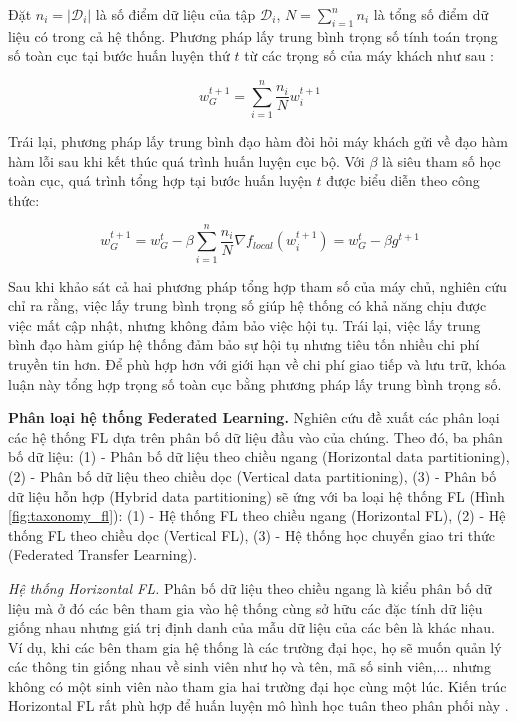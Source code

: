 Đặt $n_i = |\mathcal{D}_i|$ là số điểm dữ liệu của tập $\mathcal{D}_i$, $N = \sum_{i=1}^n{n_i}$ là tổng số điểm dữ liệu có trong cả hệ thống. Phương pháp lấy trung bình trọng số tính toán trọng số toàn cục tại bước huấn luyện thứ $t$ từ các trọng số của máy khách như sau \cite{mcmahan2017communication}:

\begin{equation}
    \label{eq:agg_w}
    w_G^{t+1} = \sum_{i=1}^n{\frac{n_i}{N} w_i^{t+1}}
\end{equation}

Trái lại, phương pháp lấy trung bình đạo hàm đòi hỏi máy khách gửi về đạo hàm hàm lỗi sau khi kết thúc quá trình huấn luyện cục bộ. Với $\beta$ là siêu tham số học toàn cục, quá trình tổng hợp tại bước huấn luyện $t$ được biểu diễn theo công thức:

\begin{dmath}
    w_G^{t+1} = w_G^t - \beta  \sum_{i=1}^n{\frac{n_i}{N} \nabla f_{local}(w_i^{t+1})}
        = w_G^t - \beta g^{t+1}
\end{dmath}

Sau khi khảo sát cả hai phương pháp tổng hợp tham số của máy chủ, nghiên cứu \cite{yin2021comprehensive} chỉ ra rằng, việc lấy trung bình trọng số giúp hệ thống có khả năng chịu được việc mất cập nhật, nhưng không đảm bảo việc hội tụ. Trái lại, việc lấy trung bình đạo hàm giúp hệ thống đảm bảo sự hội tụ nhưng tiêu tốn nhiều chi phí truyền tin hơn. Để phù hợp hơn với giới hạn về chi phí giao tiếp và lưu trữ, khóa luận này tổng hợp trọng số toàn cục bằng phương pháp lấy trung bình trọng số.

\textbf{Phân loại hệ thống Federated Learning.} Nghiên cứu \cite{yin2021comprehensive} đề xuất các phân loại các hệ thống FL dựa trên phân bố dữ liệu đầu vào của chúng. Theo đó, ba phân bố dữ liệu: (1) - Phân bố dữ liệu theo chiều ngang (Horizontal data partitioning), (2) - Phân bố dữ liệu theo chiều dọc (Vertical data partitioning), (3) - Phân bố dữ liệu hỗn hợp (Hybrid data partitioning) sẽ ứng với ba loại hệ thống FL (Hình \ref{fig:taxonomy_fl}): (1) - Hệ thống FL theo chiều ngang (Horizontal FL), (2) - Hệ thống FL theo chiều dọc (Vertical FL), (3) - Hệ thống học chuyển giao tri thức (Federated Transfer Learning).

\textit{Hệ thống Horizontal FL.} Phân bố dữ liệu theo chiều ngang là kiểu phân bố dữ liệu mà ở đó các bên tham gia vào hệ thống cùng sở hữu các đặc tính dữ liệu giống nhau nhưng giá trị định danh của mẫu dữ liệu của các bên là khác nhau. Ví dụ, khi các bên tham gia hệ thống là các trường đại học, họ sẽ muốn quản lý các thông tin giống nhau về sinh viên như họ và tên, mã số sinh viên,... nhưng không có một sinh viên nào tham gia hai trường đại học cùng một lúc. Kiến trúc Horizontal FL rất phù hợp để huấn luyện mô hình học tuân theo phân phối này \cite{yin2021comprehensive}.

